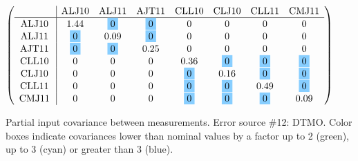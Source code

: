\begin{table}[H]
\scriptsize
\begin{center}
\renewcommand{\arraystretch}{1.1}
\begin{math}\left(\begin{array}{c|ccccccc}
 & \mathrm{ALJ10} & 
\mathrm{ALJ11} & 
\mathrm{AJT11} & 
\mathrm{CLL10} & 
\mathrm{CLJ10} & 
\mathrm{CLL11} & 
\mathrm{CMJ11} \\
\hline
\mathrm{ALJ10} \hspace*{2pt} &       1.44 &  \colorbox{SkyBlue1}{$ 0$} &  \colorbox{SkyBlue1}{$ 0$} &  0 &  0 &  0 &  0 \\
\mathrm{ALJ11} \hspace*{2pt} &  \colorbox{SkyBlue1}{$ 0$} &       0.09 &  \colorbox{SkyBlue1}{$ 0$} &  0 &  0 &  0 &  0 \\
\mathrm{AJT11} \hspace*{2pt} &  \colorbox{SkyBlue1}{$ 0$} &  \colorbox{SkyBlue1}{$ 0$} &       0.25 &  0 &  0 &  0 &  0 \\
\mathrm{CLL10} \hspace*{2pt} &  0 &  0 &  0 &       0.36 &  \colorbox{SkyBlue1}{$ 0$} &  \colorbox{SkyBlue1}{$ 0$} &  \colorbox{SkyBlue1}{$ 0$} \\
\mathrm{CLJ10} \hspace*{2pt} &  0 &  0 &  0 &  \colorbox{SkyBlue1}{$ 0$} &       0.16 &  \colorbox{SkyBlue1}{$ 0$} &  \colorbox{SkyBlue1}{$ 0$} \\
\mathrm{CLL11} \hspace*{2pt} &  0 &  0 &  0 &  \colorbox{SkyBlue1}{$ 0$} &  \colorbox{SkyBlue1}{$ 0$} &       0.49 &  \colorbox{SkyBlue1}{$ 0$} \\
\mathrm{CMJ11} \hspace*{2pt} &  0 &  0 &  0 &  \colorbox{SkyBlue1}{$ 0$} &  \colorbox{SkyBlue1}{$ 0$} &  \colorbox{SkyBlue1}{$ 0$} &       0.09 \\
\end{array}\right)\end{math}
\caption{Partial input covariance between measurements. Error source \#12: DTMO. Color boxes indicate covariances lower than nominal values by a factor up to 2 (green), up to 3 (cyan) or greater than 3 (blue).}
\renewcommand{\arraystretch}{1}
\end{center}
\end{table}
